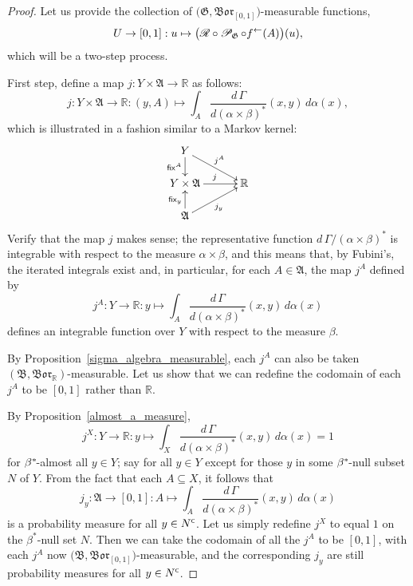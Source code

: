 \documentclass[
twoside=true,
paper=letter,
fontsize=9pt,
pagesize=auto,
leqno,
openany,
headsepline,
overfullrule,
]{scrbook}
\theoremstyle{plain}
\theoremstyle{plain}
\theoremstyle{definition}
\theoremstyle{bfnoteitalic}
\theoremstyle{bfnoteroman}
\newcommand{\sigalg}[1]{\mathfrak{#1}}
\newcommand{\cali}[1]{\mathscr{#1}}
\newcommand{\sfop}[1]{\mathsf{#1}}
\newcommand{\condprobop}[1]{\mathop{\cali{P}\hspace{-1pt}}\nolimits_{#1}}
\newcommand{\borel}{\mathfrak{Bor}}
\newcommand{\comp}{^{\hbox{\tiny{$\mathsf C$}}}}
\newcommand{\preimage}[1]{#1^{\leftarrow}}
\newcommand{\R}{\mathbb{R}}
\newcommand{\sigmaalgebra}{\sigalg{A}}
\newcommand{\sigmaalgebraii}{\sigalg{B}}
\newcommand{\kernast}{\ast\kern-1pt}
\newcommand{\funcj}{j}
\newcommand{\function}{f}
\newcommand{\measurespace}{X}
\newcommand{\measurespaceii}{Y}
\newcommand{\mspaceelt}{x}
\newcommand{\mspaceeltii}{y}
\newcommand{\seti}{A}
\newcommand{\regular}{\cali{R}}
\newcommand{\fixinthefirst}[1]{\sfop{fix}_{#1}}
\newcommand{\fixinthesecond}[1]{\sfop{fix}^{#1}}
\newcommand{\uspace}{U}%
\newcommand{\uspaceelt}{u}
\newcommand{\measonprod}{\Gamma}%
\newcommand{\marginalone}{\alpha}%
\newcommand{\marginaltwo}{\beta}%
\begin{document}
\begin{proof}
Let us provide the collection of
$\bigl(\sigalg{G}, \borel_{[0,1]}\bigr)$\hyp{}measurable functions,
\[
\uspace\to [0,1] : \uspaceelt\mapsto
\bigl( \regular\circ\condprobop{\sigalg{G}}\circ\preimage{\function}
(\seti)\bigr)(\uspaceelt),
\]
which will be a two-step process.

First step, define a map
$\funcj:\measurespaceii\times\sigmaalgebra\to \R$ as follows:
\[
\funcj
:\measurespaceii\times\sigmaalgebra\to \R
:(\mspaceeltii,\seti)\mapsto
\int_\seti
\dfrac{d\,\measonprod}{d(\marginalone\times\marginaltwo)^*}
(\mspaceelt,\mspaceeltii)\, d\marginalone(\mspaceelt),
\]
which is illustrated in a fashion similar to a Markov kernel:
\[
\xymatrix@R=16pt@C=30pt{
\measurespaceii
\ar[d]_-{\fixinthesecond{\seti}}
\ar[dr]^{\funcj^\seti} &
\\
\measurespaceii\times\sigmaalgebra \ar[r]^{\funcj} & \R
\\
\sigmaalgebra
\ar[ur]_{\funcj_\mspaceeltii}
\ar[u]^{\fixinthefirst{\mspaceeltii}} &
\\
}
\]
Verify that the map $\funcj$ makes sense; the representative function
$d\,\measonprod/(\marginalone\times\marginaltwo)^*$
is integrable with respect to the measure
$\marginalone\times\marginaltwo$, and this means that, by Fubini's, the iterated integrals exist and, in particular, for each
$\seti\in\sigmaalgebra$,
the map $\funcj^\seti$ defined by
\[
\funcj^\seti:
\measurespaceii\to \R
:\mspaceeltii\mapsto
\int_\seti
\dfrac{d\,\measonprod}{d(\marginalone\times\marginaltwo)^*}
(\mspaceelt,\mspaceeltii)\, d\marginalone(\mspaceelt)
\]
defines an integrable function over
$\measurespaceii$ with respect to the measure $\marginaltwo$.

By Proposition~\ref{sigma_algebra_measurable}, each $\funcj^\seti$ can also be taken
$(\sigmaalgebraii,\borel_\R)$\hyp{}measurable.
Let us show that we can redefine the codomain of each
$\funcj^\seti$ to be $[0,1]$ rather than $\R$.

By Proposition~\ref{almost_a_measure},
\[
\funcj^\measurespace:
\measurespaceii\to\R:\mspaceeltii\mapsto
\int_\measurespace \dfrac{d\,\measonprod}{d(\marginalone\times\marginaltwo)^*}
(\mspaceelt,\mspaceeltii)
\,d\marginalone(\mspaceelt)
=
1
\]
for $\marginaltwo^\kernast$\hyp{}almost all  $\mspaceeltii\in\measurespaceii$; say for all
$\mspaceeltii\in\measurespaceii$ except for  those
$\mspaceeltii$ in some $\marginaltwo^\kernast$\hyp{}null subset $N$ of
$\measurespaceii$.
From the fact that each $\seti\subseteq\measurespace$, it follows that
\[
\funcj_\mspaceeltii :\sigmaalgebra \to [0,1]
: \seti \mapsto
\int_\seti
\dfrac{d\,\measonprod}{d(\marginalone\times\marginaltwo)^*}
(\mspaceelt,\mspaceeltii)\, d\marginalone(\mspaceelt)
\]
is a probability measure for all $\mspaceeltii\in N\comp$.
Let us simply redefine $\funcj^\measurespace$ to equal $1$ on the
$\marginaltwo^*$\hyp{}null
set $N$.  Then we can take the codomain of all the $\funcj^\seti$ to be $[0,1]$,
with each $\funcj^\seti$ now
$\bigl( \sigmaalgebraii, \borel_{[0,1]} \bigr)$\hyp{}measurable,
and the corresponding $\funcj_\mspaceeltii$ are still probability measures for all
$\mspaceeltii\in N\comp$.


\end{proof}
\end{document}
